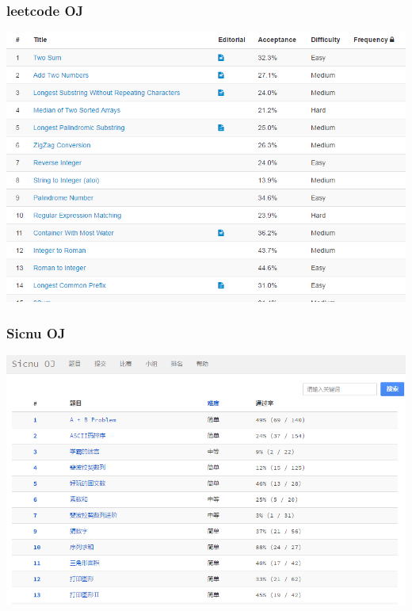 \documentclass{beamer}
\begin{document}
\begin{frame}
\frametitle{leetcode OJ}
\includegraphics[scale=0.4]{leetcode-oj.png}
\end{frame}


\begin{frame}
\frametitle{Sicnu OJ}
\includegraphics[scale=0.5]{sicnu-oj.png}
\end{frame}
\end{document}

